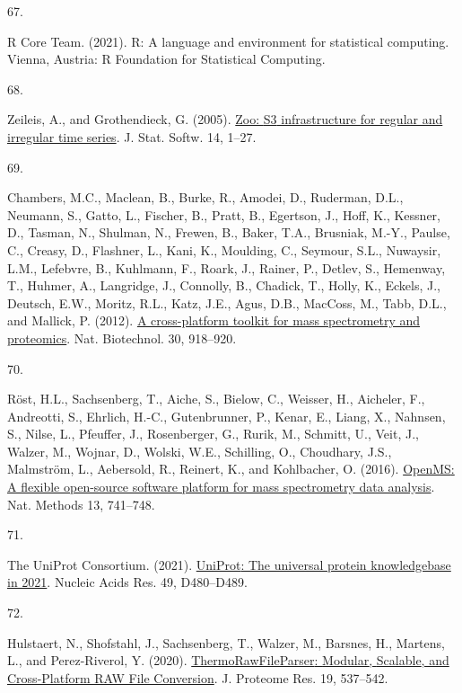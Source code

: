 \documentclass[
]{article}
\newlength{\cslhangindent}
\newlength{\csllabelwidth}
\newlength{\cslentryspacingunit} %
\newenvironment{CSLReferences}[2] %
 {%
  \setlength{\parindent}{0pt}
  \ifodd #1
  \let\oldpar\par
  \def\par{\hangindent=\cslhangindent\oldpar}
  \fi
  \setlength{\parskip}{#2\cslentryspacingunit}
 }%
 {}
\newcommand{\CSLLeftMargin}[1]{\parbox[t]{\csllabelwidth}{#1}}
\newcommand{\CSLRightInline}[1]{\parbox[t]{\linewidth - \csllabelwidth}{#1}\break}
\begin{document}
\begin{CSLReferences}{0}{0}
\leavevmode{}%
\CSLLeftMargin{67. }
\CSLRightInline{R Core Team. (2021). R: {A} language and environment for statistical computing. {Vienna, Austria}: {R Foundation for Statistical Computing}.}

\leavevmode{}%
\CSLLeftMargin{68. }
\CSLRightInline{Zeileis, A., and Grothendieck, G. (2005). \href{https://doi.org/10.18637/jss.v014.i06}{Zoo: {S3} infrastructure for regular and irregular time series}. J. Stat. Softw. 14, 1--27.}

\leavevmode{}%
\CSLLeftMargin{69. }
\CSLRightInline{Chambers, M.C., Maclean, B., Burke, R., Amodei, D., Ruderman, D.L., Neumann, S., Gatto, L., Fischer, B., Pratt, B., Egertson, J., Hoff, K., Kessner, D., Tasman, N., Shulman, N., Frewen, B., Baker, T.A., Brusniak, M.-Y., Paulse, C., Creasy, D., Flashner, L., Kani, K., Moulding, C., Seymour, S.L., Nuwaysir, L.M., Lefebvre, B., Kuhlmann, F., Roark, J., Rainer, P., Detlev, S., Hemenway, T., Huhmer, A., Langridge, J., Connolly, B., Chadick, T., Holly, K., Eckels, J., Deutsch, E.W., Moritz, R.L., Katz, J.E., Agus, D.B., MacCoss, M., Tabb, D.L., and Mallick, P. (2012). \href{https://doi.org/10.1038/nbt.2377}{A cross-platform toolkit for mass spectrometry and proteomics}. Nat. Biotechnol. 30, 918--920.}

\leavevmode{}%
\CSLLeftMargin{70. }
\CSLRightInline{Röst, H.L., Sachsenberg, T., Aiche, S., Bielow, C., Weisser, H., Aicheler, F., Andreotti, S., Ehrlich, H.-C., Gutenbrunner, P., Kenar, E., Liang, X., Nahnsen, S., Nilse, L., Pfeuffer, J., Rosenberger, G., Rurik, M., Schmitt, U., Veit, J., Walzer, M., Wojnar, D., Wolski, W.E., Schilling, O., Choudhary, J.S., Malmström, L., Aebersold, R., Reinert, K., and Kohlbacher, O. (2016). \href{https://doi.org/10.1038/nmeth.3959}{{OpenMS}: A flexible open-source software platform for mass spectrometry data analysis}. Nat. Methods 13, 741--748.}

\leavevmode{}%
\CSLLeftMargin{71. }
\CSLRightInline{The UniProt Consortium. (2021). \href{https://doi.org/10.1093/nar/gkaa1100}{{UniProt}: The universal protein knowledgebase in 2021}. Nucleic Acids Res. 49, D480--D489.}

\leavevmode{}%
\CSLLeftMargin{72. }
\CSLRightInline{Hulstaert, N., Shofstahl, J., Sachsenberg, T., Walzer, M., Barsnes, H., Martens, L., and Perez-Riverol, Y. (2020). \href{https://doi.org/10.1021/acs.jproteome.9b00328}{{ThermoRawFileParser}: {Modular}, {Scalable}, and {Cross-Platform RAW File Conversion}}. J. Proteome Res. 19, 537--542.}


\end{CSLReferences}
\end{document}

